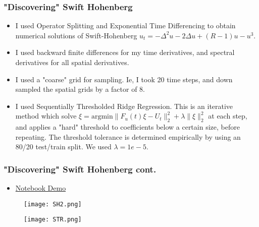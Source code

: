 \documentclass[]{beamer}
\begin{document}
\begin{frame}
     \frametitle{"Discovering" Swift Hohenberg}
     \begin{itemize}
         \item I used Operator Splitting and Exponential Time Differencing to obtain numerical solutions of Swift-Hohenberg $u_t = -\Delta^2 u - 2\Delta u + (R-1)u - u^3.$ 
        \item I used backward finite differences for my time derivatives, and spectral derivatives for all spatial derivatives.
        \item I used a "coarse" grid for sampling. Ie, I took 20 time steps, and down sampled the spatial grids by a factor of 8.
        \item I used Sequentially Thresholded Ridge Regression. This is an iterative method which solve $\xi = \text{argmin}\|F_u(t)\xi-U_t\|_2^2 + \lambda \|\xi\|_2^2$ at each step, and applies a "hard" threshold to coefficients below a certain size, before repeating. The threshold tolerance is determined empirically by using an 80/20 test/train split. We used $\lambda = 1e-5$.
     \end{itemize}
\end{frame}

\begin{frame}
     \frametitle{"Discovering" Swift Hohenberg cont.}
     \begin{itemize}
         \item \href{https://github.com/EMcDugald/convection_patterns_wip/blob/master/code/ml_experiments/my_experiments/phase_surface.ipynb}{Notebook Demo}
     \end{itemize}
      \begin{figure}
        \centering
        \texttt{[image: SH2.png]}
        \end{figure}
 \begin{figure}
        \centering
        \texttt{[image: STR.png]}
        \end{figure}
\end{frame}
\end{document}
